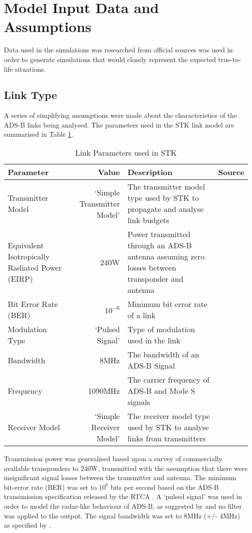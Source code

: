 \section{Model Input Data and Assumptions}
Data used in the simulations was researched from official sources was used in order to generate simulations that would closely represent the expected true-to-life situations. 
\subsection{Link Type}
A series of simplifying assumptions were made about the characteristics of the ADS-B links being analysed. The parameters used in the STK link model are summarised in Table \ref{tab:linkParams}. 
\begin{table}[H]
  \centering
  \caption{Link Parameters used in STK}
    \begin{tabular}{p{3cm}rp{5cm}r}
    \toprule
    \textbf{Parameter} & \textbf{Value} & \textbf{Description} & \textbf{Source} \\
    \midrule
    Transmitter Model & `Simple Transmitter Model' & The transmitter model type used by STK to propagate and analyse link budgets & \cite{STKOnline} \\ \hline
    Equivalent Isotropically Radiated Power (EIRP) & 240W & Power transmitted through an ADS-B antenna assuming zero losses between transponder and antenna & \cite{Garmin2007,Corporation2011,TrigAvionics,BendixKing2013}  \\ \hline
    Bit Error Rate (BER) & $10^{-6}$ & Minimum bit error rate of a link &  \cite{RTCA2013}  \\ \hline
    Modulation Type & `Pulsed Signal' & Type of modulation used in the link &  \\ \hline
    Bandwidth & 8MHz & The bandwidth of an ADS-B Signal &  \cite{RTCA2013}  \\ \hline
    Frequency & 1090MHz & The carrier frequency of ADS-B and Mode S signals &  \cite{STKOnline} \\ \hline
    Receiver Model & `Simple Receiver Model' & The receiver model type used by STK to analyse links from transmitters &  \cite{STKOnline} \\ 
    \bottomrule
    \end{tabular}%
  \label{tab:linkParams}%
\end{table}%

Transmission power was generalised based upon a survey of commercially available transponders \cite{Garmin2007,Corporation2011,TrigAvionics,BendixKing2013} to 240W, transmitted with the assumption that there were insignificant signal losses between the transmitter and antenna. The minimum bit-error rate (BER) was set to $10^6$ bits per second based on the ADS-B  transimission specification released by the RTCA \cite{RTCA2013}. A `pulsed signal' was used in order to model the radar-like behaviour of ADS-B, as suggested by \cite{STKOnline} and no filter was applied to the output. The signal bandwidth was set to 8MHz (+/- 4MHz) as specified by \cite{RTCA2013}. 

